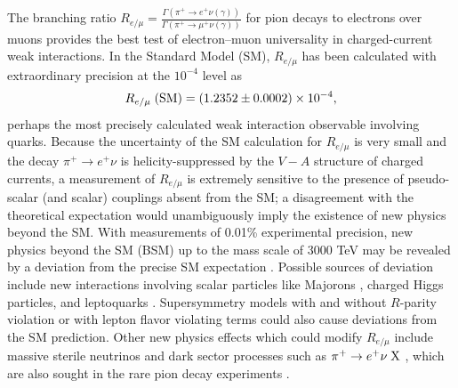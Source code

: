 
The branching ratio 
$R_{e/\mu} = \frac{\Gamma\left(\pi^+ \rightarrow e^+ \nu (\gamma) \right)}{\Gamma\left(\pi^+ \rightarrow \mu^+ \nu (\gamma)\right)}$
for pion decays to electrons over muons provides the best test of electron--muon universality in charged-current weak interactions. In the Standard Model (SM), $R_{e/\mu}$ has been calculated with extraordinary precision at the $10^{-4}$ level as \cite{Cirigliano1,Cirigliano2,Bryman1}
\begin{equation}
\label{Remu_SM}
    R_{e/\mu} \hspace{0.1cm}\text{(SM)} = (1.2352\pm 0.0002)\times10^{-4},
\end{equation}
perhaps the most precisely calculated weak interaction observable involving quarks. Because the
uncertainty of the SM calculation for $R_{e/\mu}$ is very small and the decay $\pi^+ \rightarrow e^+ \nu$ is helicity-suppressed by the $V-A$ structure of charged currents, a measurement of $R_{e/\mu}$ is extremely sensitive to the presence of pseudo-scalar (and scalar) couplings absent from the SM; a disagreement with the theoretical expectation would unambiguously imply the existence of new physics beyond the SM. With measurements of 0.01\% experimental precision, new physics beyond the SM (BSM) up to the mass scale of 3000 TeV may be revealed by a deviation from the precise SM expectation \cite{Bryman1}. Possible sources of deviation include new interactions involving scalar particles like Majorons \cite{Lessa}, charged Higgs particles, and leptoquarks \cite{Campbell}. Supersymmetry models with and without $R$-parity violation \cite{Ramsey-Musolf} or with lepton flavor violating terms \cite{Masiero} could also cause deviations from the SM prediction. Other new physics effects which could modify $R_{e/\mu}$ include massive sterile neutrinos \cite{Bryman2} and dark sector processes such as $\pi^+ \rightarrow e^+ \nu \hspace{1mm}\textrm{X}$ \cite{Altmannshofer}, which are also sought in the rare pion decay experiments \cite{Aguilar-Arevalo1, Aguilar-Arevalo2}. 

